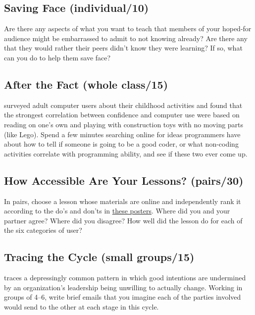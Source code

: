 \subsection*{Saving Face (individual/10)}

Are there any aspects of what you want to teach that members of your
hoped-for audience might be embarrassed to admit to not knowing already?
Are there any that they would rather their peers didn't know they were
learning? If so, what can you do to help them save face?

\subsection*{After the Fact (whole class/15)}

\cite{Cutt2017} surveyed adult computer users about their childhood
activities and found that the strongest correlation between confidence
and computer use were based on reading on one's own and playing with
construction toys with no moving parts (like Lego). Spend a few minutes
searching online for ideas programmers have about how to tell if someone
is going to be a good coder, or what non-coding activities correlate
with programming ability, and see if these two ever come up.

\subsection*{How Accessible Are Your Lessons? (pairs/30)}

In pairs, choose a lesson whose materials are online and independently
rank it according to the do's and don'ts in \href{https://accessibility.blog.gov.uk/2016/09/02/dos-and-donts-on-designing-for-accessibility/}{these
posters}. Where did you and your partner
agree? Where did you disagree? How well did the lesson do for each of
the six categories of user?

\subsection*{Tracing the Cycle (small groups/15)}

\cite{Coco2018} traces a depressingly common pattern in which good
intentions are undermined by an organization's leadership being
unwilling to actually change. Working in groups of 4--6, write brief
emails that you imagine each of the parties involved would send to the
other at each stage in this cycle.
